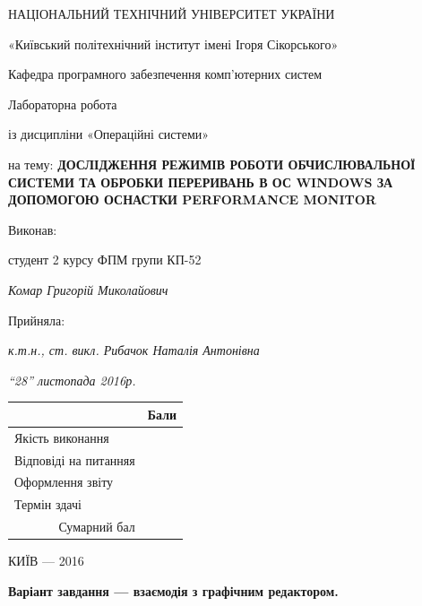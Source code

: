\documentclass[12pt,a4paper]{article}
\begin{document}
\begin{titlepage}
  {\centering
	\Large НАЦІОНАЛЬНИЙ ТЕХНІЧНИЙ УНІВЕРСИТЕТ УКРАЇНИ\par
	\large «Київський політехнічний інститут імені Ігоря Сікорського»\par
	\vspace{1cm}
	Кафедра програмного забезпечення комп'ютерних систем\par
	\vspace{1cm}
	\normalsize Лабораторна робота \par
	із дисципліни «Операційні системи»\par
	\vspace{2cm}
	на тему: \textbf{ДОСЛІДЖЕННЯ РЕЖИМІВ РОБОТИ ОБЧИСЛЮВАЛЬНОЇ
	СИСТЕМИ ТА ОБРОБКИ ПЕРЕРИВАНЬ В ОС WINDOWS
	ЗА ДОПОМОГОЮ ОСНАСТКИ PERFORMANCE MONITOR}}
	\vspace{1cm}
	\begin{flushright}
	  Виконав:

		студент 2 курсу ФПМ групи КП-52

		\textit{Комар Григорій Миколайович}

		\vspace{1cm}

		Прийняла:

		\textit{к.т.н., ст. викл. Рибачок Наталія Антонівна}

		\textit{“28” листопада 2016р.}

		\vspace{1cm}
		\begin{tabular}{|l|l|}
		  \hline
			&Бали\\ \hline
			Якість виконання&\\ \hline
			Відповіді на питанняя&\\ \hline
			Оформлення звіту&\\ \hline
			Термін здачі&\\ \hline
			\multicolumn{1}{|r|}{Сумарний бал}&\\ \hline
		\end{tabular}
	\end{flushright}
	\vfill
	\centering КИЇВ — 2016
\end{titlepage}
\addtocounter{page}{1}

\textbf{Варіант завдання — взаємодія з графічним редактором.}
\end{document}
